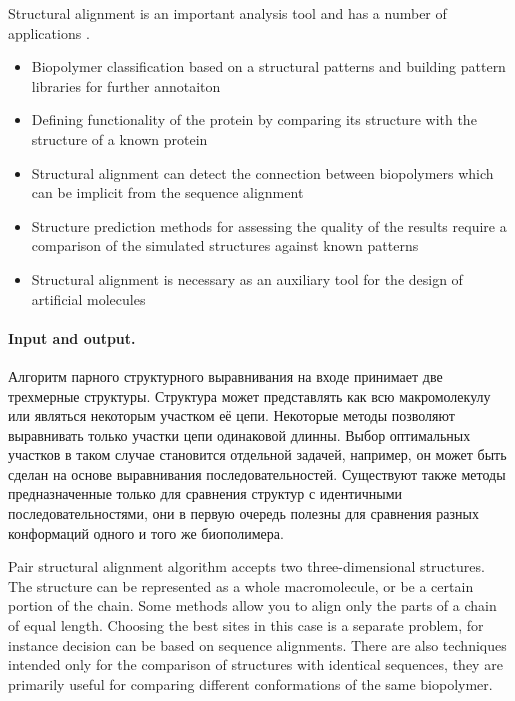 \documentclass[a4paper, 12pt, titlepage, utf8]{extarticle}
\begin{document}
Structural alignment is an important analysis tool and has a number of
applications \cite{structural-bionformatics}.
\begin{itemize}
    \item Biopolymer classification based on a structural patterns and building
pattern libraries for further annotaiton
    \item Defining functionality of the protein by comparing its structure with
the structure of a known protein
    \item Structural alignment can detect the connection between biopolymers
which can be implicit from the sequence alignment
    \item Structure prediction methods for assessing the quality of the results
require a comparison of the simulated structures against known patterns
    \item  Structural alignment is necessary as an auxiliary tool for the design
of artificial molecules
\end{itemize}

\paragraph{Input and output.}
\begin{original}
Алгоритм парного структурного выравнивания на входе принимает две трехмерные
структуры. Структура может представлять как всю макромолекулу или являться
некоторым участком её цепи. Некоторые методы позволяют выравнивать только
участки цепи одинаковой длинны. Выбор оптимальных участков в таком случае
становится отдельной задачей, например, он может быть сделан на основе
выравнивания последовательностей. Существуют также методы предназначенные только
для сравнения структур с идентичными последовательностями, они в первую очередь
полезны для сравнения разных конформаций одного и того же биополимера.
\end{original}

Pair structural alignment algorithm accepts two three-dimensional structures.
The structure can be represented as a whole macromolecule, or be a certain
portion of the chain. Some methods allow you to align only the parts of a chain
of equal length. Choosing the best sites in this case is a separate problem, for
instance decision can be based on sequence alignments. There are also techniques
intended only for the comparison of structures with identical sequences, they
are primarily useful for comparing different conformations of the same
biopolymer.
\end{document}
